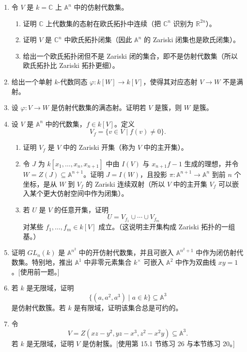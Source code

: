 \begin{enumerate}[label=\arabic*.]
	\item 令 $V$ 是 $k=\mathbb C$ 上 $\mathbb A^n$ 中的仿射代数集。
	\begin{enumerate}[label=(\alph*)]
		\item 证明 $\mathbb C$ 上代数集的态射在欧氏拓扑中连续（把 $\mathbb C^n$ 识别为 $\mathbb R^{2n}$）。
		\item 证明 $V$ 是 $\mathbb C^n$ 中欧氏拓扑闭集（因此 $\mathbb A^n$ 的 Zariski 闭集也是欧氏闭集）。
		\item 给出一个欧氏拓扑闭但不是 Zariski 闭的集合，即不是仿射代数集（所以欧氏拓扑比 Zariski 拓扑更细）。
	\end{enumerate}
	
	\item 给出一个单射 $k$-代数同态 $\varphi:k[W]\to k[V]$，使得其对应态射 $V\to W$ 不是满射。
	
	\item 设 $\varphi:V\to W$ 是仿射代数集的满态射。证明若 $V$ 是簇，则 $W$ 是簇。
	
	\item 设 $V$ 是 $\mathbb A^n$ 中的代数集，$f\in k[V]$。定义
	\[
	V_f=\{v\in V\mid f(v)\ne0\}.
	\]
	\begin{enumerate}[label=(\alph*)]
		\item 证明 $V_f$ 是 $V$ 中的 Zariski 开集（称为 $V$ 中的主开集）。
		\item 令 $J$ 为 $k[x_1,
		\ldots,x_n,x_{n+1}]$ 中由 $I(V)$ 与 $x_{n+1}f-1$ 生成的理想，并令 $W=Z(J)\subseteq\mathbb A^{n+1}$。证明 $J=I(W)$，且投影 $\pi:\mathbb A^{n+1}\to\mathbb A^n$ 到前 $n$ 个坐标，是从 $W$ 到 $V_f$ 的 Zariski 连续双射（所以 $V$ 中的主开集 $V_f$ 可以嵌入某个更大仿射空间中作为闭集）。
		\item 若 $U$ 是 $V$ 的任意开集，证明
		\[
		U=V_{f_1}\cup\cdots\cup V_{f_m}
		\]
		对某些 $f_1,
		\ldots,f_m\in k[V]$ 成立。（这说明主开集构成 Zariski 拓扑的一组基。）
	\end{enumerate}
	
	\item 证明 $GL_n(k)$ 是 $\mathbb A^{n^2}$ 中的开仿射代数集，并且可嵌入 $\mathbb A^{n^2+1}$ 中作为闭仿射代数集。特别地，推出 $\mathbb A^1$ 中非零元素集合 $k^\times$ 可嵌入 $\mathbb A^2$ 中作为双曲线 $xy=1$。[使用前一题。]
	
	\item 若 $k$ 是无限域，证明
	\[
	\{(a,a^2,a^3)\mid a\in k\}\subseteq\mathbb A^3
	\]
	是仿射代数簇。若 $k$ 是有限域，证明该集合总是可约的。
	
	\item 令
	\[
	V=Z(xz-y^2,
	yz-x^3,
	z^2-x^2y)\subseteq\mathbb A^3.
	\]
	若 $k$ 是无限域，证明 $V$ 是仿射簇。[使用第 15.1 节练习 26 与本节练习 20。]
	

\end{enumerate}
